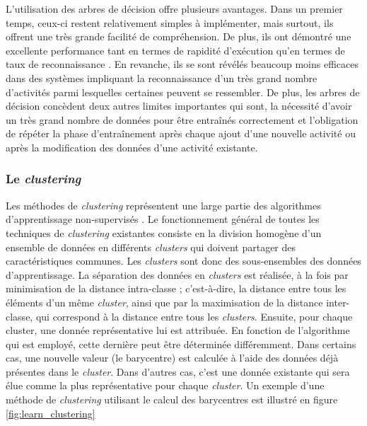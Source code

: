 L'utilisation des arbres de décision offre plusieurs avantages. Dans un premier temps, ceux-ci restent relativement simples à implémenter, mais surtout, ils offrent une très grande facilité de compréhension. De plus, ils ont démontré une excellente performance tant en termes de rapidité d'exécution qu'en termes de taux de reconnaissance \citep{Bao2004}. En revanche, ils se sont révélés beaucoup moins efficaces dans des systèmes impliquant la reconnaissance d'un très grand nombre d'activités parmi lesquelles certaines peuvent se ressembler. De plus, les arbres de décision concèdent deux autres limites importantes qui sont, la nécessité d'avoir un très grand nombre de données pour être entraînés correctement et l'obligation de répéter la phase d'entraînement après chaque ajout d'une nouvelle activité ou après la modification des données d'une activité existante. 

\subsubsection{Le \textit{clustering}}

Les méthodes de \textit{clustering} représentent une large partie des algorithmes d'apprentissage non-supervisés \citep{Witten2011}. Le fonctionnement général de toutes les techniques de \textit{clustering} existantes consiste en la division homogène d'un ensemble de données en différents \textit{clusters} qui doivent partager des caractéristiques communes. Les \textit{clusters} sont donc des sous-ensembles des données d'apprentissage. La séparation des données en \textit{clusters} est réalisée, à la fois par minimisation de la distance intra-classe ; c'est-à-dire, la distance entre tous les éléments d'un même \textit{cluster}, ainsi que par la maximisation de la distance inter-classe, qui correspond à la distance entre tous les \textit{clusters}. Ensuite, pour chaque cluster, une donnée représentative lui est attribuée. En fonction de l'algorithme qui est employé, cette dernière peut être déterminée différemment. Dans certains cas, une nouvelle valeur (le barycentre) est calculée à l'aide des données déjà présentes dans le \textit{cluster}. Dans d'autres cas, c'est une donnée existante qui sera élue comme la plus représentative pour chaque \textit{cluster}. Un exemple d'une méthode de \textit{clustering} utilisant le calcul des barycentres est illustré en figure \ref{fig:learn_clustering}

